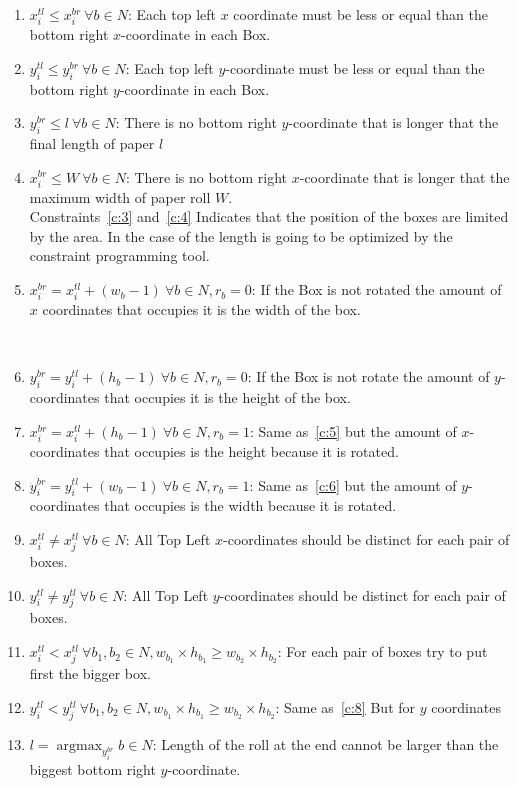 \documentclass[12pt, a4paper]{article}
\DeclareMathOperator*{\argmax}{argmax} %
\begin{document}
\begin{enumerate}
  \item $x_i^{tl} \leq x_i^{br}\ \forall b \in N$: Each top left $x$ coordinate must be less or equal than the bottom right $x$-coordinate in each Box.
  \item $y_i^{tl} \leq y_i^{br}\ \forall b \in N$: Each top left $y$-coordinate must be less or equal than the bottom right $y$-coordinate in each Box.
  \item\label{c:3} $y_i^{br} \leq l\ \forall b \in N$: There is no bottom right $y$-coordinate that is longer that the final length of paper $l$
  \item\label{c:4} $x_i^{br} \leq W\ \forall b \in N$: There is no bottom right $x$-coordinate that is longer that the maximum width of paper roll $W$.\\
  Constraints~\ref{c:3} and~\ref{c:4} Indicates that the position of the boxes are limited by the area. In the case of the length is going to be optimized by the constraint programming tool.
\item\label{c:5} $x_i^{br} = x_i^{tl} + (w_b - 1)\ \forall b \in N, r_b = 0$: If the Box is not rotated the amount of $x$ coordinates that occupies it is the width of the box.

\
\item\label{c:6} $y_i^{br} = y_i^{tl} + (h_b - 1)\ \forall b \in N, r_b = 0$: If the Box is not rotate the amount of $y$-coordinates that occupies it is the height of the box.
\item $x_i^{br} = x_i^{tl} + (h_b - 1)\ \forall b \in N, r_b = 1$: Same as~\ref{c:5} but the amount of $x$-coordinates that occupies is the height because it is rotated.
  \item $y_i^{br} = y_i^{tl} + (w_b - 1)\ \forall b \in N, r_b = 1$: Same as~\ref{c:6} but the amount of $y$-coordinates that occupies is the width because it is rotated.
  \item $x_i^{tl} \neq x_j^{tl}\ \forall b \in N$: All Top Left $x$-coordinates should be distinct for each pair of boxes.
  \item $y_i^{tl} \neq y_j^{tl}\ \forall b \in N$: All Top Left $y$-coordinates should be distinct for each pair of boxes.
  \item\label{c:8} $x_i^{tl} < x_j^{tl}\ \forall b_1, b_2 \in N, w_{b_1} \times h_{b_1} \geq w_{b_2} \times h_{b_2}$: For each pair of boxes try to put first the bigger box.
  \item $y_i^{tl} < y_j^{tl}\ \forall b_1, b_2 \in N, w_{b_1} \times h_{b_1} \geq w_{b_2} \times h_{b_2}$: Same as~\ref{c:8} But for $y$ coordinates
  \item $l = \argmax_{y_i^{br}} {b \in N}$: Length of the roll at the end cannot be larger than the biggest bottom right $y$-coordinate.
\end{enumerate}
\end{document}
